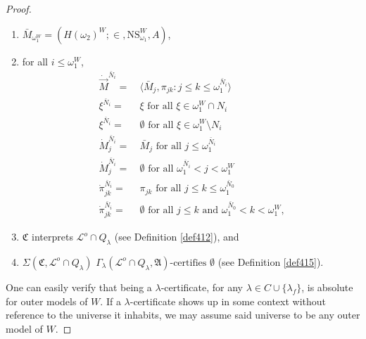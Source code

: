 \documentclass[12pt]{article}
\numberwithin{equation}{section}
\begin{document}
\begin{proof}
\begin{defi}
\begin{enumerate}[label=(C\arabic*)$_{\lambda}$, leftmargin=40pt]
    \item\label{cd7} $\bar{M}_{\omega_1^W} = (H(\omega_2)^W; \in, \mathrm{NS}_{\omega_1}^W, A)$,
    \item\label{2ndlast} for all $i \leq \omega_1^W$, 
    \begin{align*}
         \dot{\Vec{M}}^{\bar{N}_i} = \ & \langle \bar{M}_j, \pi_{jk} : j \leq k \leq \omega_1^{\bar{N}_i} \rangle \\
         \xi^{\bar{N}_i} = \ & \xi \text{ for all } \xi \in \omega_1^W \cap N_i \\
         \xi^{\bar{N}_i} = \ & \emptyset \text{ for all } \xi \in \omega_1^W \setminus N_i \\
         \dot{M}_j^{\bar{N}_i} = \ & \bar{M}_j \text{ for all } j \leq \omega_1^{\bar{N}_i} \\
         \dot{M}_j^{\bar{N}_i} = \ & \emptyset \text{ for all } \omega_1^{\bar{N}_i} < j < \omega_1^W \\
         \dot{\pi}_{jk}^{\bar{N}_i} = \ & \pi_{jk} \text{ for all } j \leq k \leq \omega_1^{\bar{N}_0} \\
         \dot{\pi}_{jk}^{\bar{N}_i} = \ & \emptyset \text{ for all } j \leq k \text{ and } \omega_1^{\bar{N}_0} < k < \omega_1^W \text{,}
    \end{align*}
    \item\label{cdlast} $\mathfrak{C}$ interprets $\mathcal{L}^o \cap Q_{\lambda}$ (see Definition \ref{def412}), and
    \item\label{cdrlast} $\Sigma(\mathfrak{C}, \mathcal{L}^o \cap Q_{\lambda})$ $\Gamma_{\lambda} (\mathcal{L}^o \cap Q_{\lambda}, \mathfrak{A}) \text{-certifies } \emptyset$ (see Definition \ref{def415}).
\end{enumerate}
\end{defi}

One can easily verify that being a $\lambda$-certificate, for any $\lambda \in C \cup \{\lambda_f\}$, is absolute for outer models of $W$. If a $\lambda$-certificate shows up in some context without reference to the universe it inhabits, we may assume said universe to be any outer model of $W$.


\end{proof}
\end{document}
